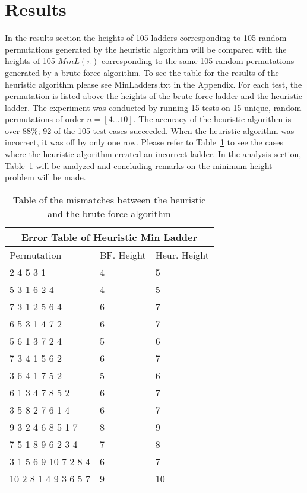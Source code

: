 \section{Results}
In the results section the heights of 105 ladders corresponding to 105 random permutations generated by the heuristic algorithm 
will be compared with the heights of 105 $MinL(\pi)$ corresponding to the same 105 random permutations generated by a brute force 
algorithm.
To see the table for the results of the heuristic algorithm please see 
MinLadders.txt in the Appendix. For each test, the permutation is listed above the heights of the brute 
force ladder and the heuristic ladder. The experiment was conducted by running 
15 tests on 15 unique, random permutations of order $n=[4 \dots 10]$.
The accuracy of the heuristic algorithm is 
over 88\%; 92 of the 105 test cases succeeded. When the heuristic algorithm was incorrect, it was off by only one row.
Please refer to Table~\ref{Table:MinHeightFailures} to see the cases where the heuristic algorithm created an incorrect ladder.
In the analysis section, Table~\ref{Table:MinHeightFailures} will be analyzed and concluding remarks on the 
minimum height problem will be made.
\begin{table}[!htp]
  \centering
     \begin{tabular}{|p{6cm}|p{2cm}|p{2cm}|}
        \hline
         \multicolumn{3}{|c|}{Error Table of Heuristic Min Ladder}\\
         \hline
        \hline 
         Permutation & BF. Height & Heur. Height\\ 
         \hline 
         2  4  5  3  1 & 4 & 5 \\ 
         \hline 
         5  3  1  6  2  4 & 4 & 5 \\ 
         \hline 
         7  3  1  2  5  6  4  & 6 & 7 \\ 
         \hline 
         6  5  3  1  4  7  2  & 6 & 7\\ 
         \hline 
         5  6  1  3  7  2  4  & 5 & 6 \\ 
         \hline 
         7  3  4  1  5  6  2  & 6 & 7 \\ 
         \hline 
         3  6  4  1  7  5  2 & 5 & 6 \\ 
         \hline 
          6  1  3  4  7  8  5  2 & 6 & 7\\ 
          \hline 
          3  5  8  2  7  6  1  4 & 6 & 7 \\ 
          \hline 
          9  3  2  4  6  8  5  1  7 & 8 & 9\\ 
          \hline 
           7  5  1  8  9  6  2  3  4 & 7 & 8 \\ 
           \hline 
            3  1  5  6  9  10  7  2  8  4 & 6 & 7 \\ 
            \hline 
          10  2  8  1  4  9  3  6  5  7 & 9 & 10 \\ 
         \hline
     \end{tabular}
     
      
     \caption{Table of the mismatches between the heuristic and the brute force algorithm}
     \label{Table:MinHeightFailures}
 \end{table}

 